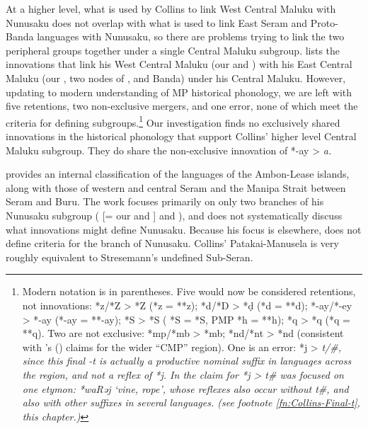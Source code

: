 At a higher level,
what is used by Collins to link West Central Maluku with Nunusaku
does not overlap with what is used to link East Seram
and Proto-Banda languages with Nunusaku,
so there are problems trying to link the two peripheral groups
together under a single Central Maluku subgroup.
\citet[40]{Collins1981} lists the innovations that link his West
Central Maluku (our 
and ) with his East Central Maluku (our ,
two nodes of ,
and Banda) under his Central Maluku.
However, updating to modern understanding of MP historical phonology,
we are left with five retentions,
two non-exclusive mergers, and one error,
none of which meet the criteria for defining subgroups.\footnote{
		Modern notation is in parentheses.
		Five would now be considered retentions,
		not innovations: *z/*Z > *Z (*z = **z); *d/*D > *ḍ (*d = **d);
		*-ay/*-ey > *-ay (*-ay = **-ay); *S > *S ( *S = *S,
		PMP *h = **h); *q > *q (*q = **q).
		Two are not exclusive: *mp/*mb > *mb; *nd/*nt > *nd (consistent
		with \citeauthor{Blust1981}'s (\citeyear[26]{Blust1981})
		claims for the wider “CMP” region).
		One is an error: *j > \it{t}/{\gap}{\#},
		since this final \it{-t} is actually a productive nominal suffix
		in languages across the region,
		and not a reflex of *j.
		In \citet{Collins1981,Collins1983} the claim for *j > \it{t}{\gap}{\#} was
		focused on one etymon: *waRəj ‘vine,
		rope’, whose reflexes also occur without \it{t}{\#},
		and also with other suffixes in several languages.
		(see footnote \ref{fn:Collins-Final-t}, this chapter.)}
Our investigation finds no
exclusively shared innovations in the historical phonology that
support Collins’ higher level Central Maluku subgroup.
They do share the non-exclusive innovation of *-ay > \it{a}.

\citet{Collins1983} provides an internal classification of the
languages of the Ambon-Lease islands,
along with those of western
and central Seram and the Manipa Strait between Seram and Buru.
The \citeyear{Collins1983} work focuses primarily on only two branches of his Nunusaku
subgroup ( [= our  and ] and ),
and does not systematically discuss what innovations might define Nunusaku.
Because his focus is elsewhere,
\citet{Collins1983} does not define criteria
for the  branch of Nunusaku.
Collins’ Patakai-Manusela is very roughly equivalent to Stresemann’s
undefined Sub-Seran.